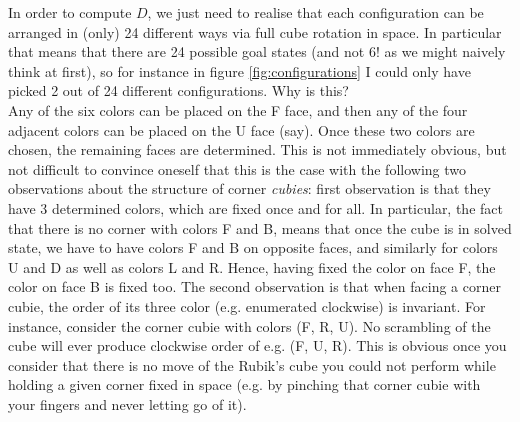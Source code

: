 In order to compute $D$, we just need to realise that each configuration can be arranged in (only) 24 different ways via full cube rotation in space. In particular that means that there are 24 possible goal states (and not 6! as we might naively think at first), so for instance in figure \ref{fig:configurations} I could only have picked 2 out of 24 different configurations. Why is this? 
\\
Any of the six colors can be placed on the F face, and then any of the four adjacent colors can be placed on the U face (say). Once these two colors are chosen, the remaining faces are determined. This is not immediately obvious, but not difficult to convince oneself that this is the case with the following two observations about the structure of corner \textit{cubies}: first observation is that they have 3 determined colors, which are fixed once and for all. In particular, the fact that there is no corner with colors F and B, means that once the cube is in solved state, we have to have colors F and B on opposite faces, and similarly for colors U and D as well as colors L and R. Hence, having fixed the color on face F, the color on face B is fixed too. The second observation is that when facing a corner cubie, the order of its three color (e.g. enumerated clockwise) is invariant. For instance, consider the corner cubie with colors (F, R, U). No scrambling of the cube will ever produce clockwise order of e.g. (F, U, R). This is obvious once you consider that there is no move of the Rubik's cube you could not perform while holding a given corner fixed in space (e.g. by pinching that corner cubie with your fingers and never letting go of it).
\\
\\
